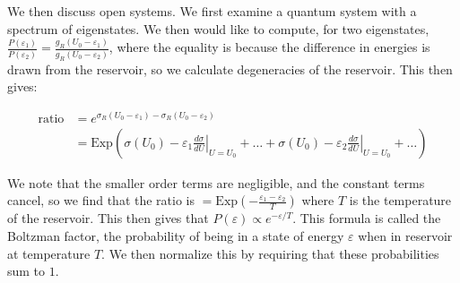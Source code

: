 \documentclass[12pt]{article}
\begin{document}
We then discuss open systems. We first examine a quantum system with a spectrum of eigenstates. We then would like to compute, for two eigenstates, $\frac{P(\varepsilon_1)}{P(\varepsilon_2)} = \frac{g_R(U_0 - \varepsilon_1)}{g_R(U_0 - \varepsilon_2)}$, where the equality is because the difference in energies is drawn from the reservoir, so we calculate degeneracies of the reservoir. This then gives:

\begin{align*}
	\text{ratio} &= e^{\sigma_R(U_0-\varepsilon_1) - \sigma_R(U_0-\varepsilon_2)}\\
	&= \mathrm{Exp}(\sigma(U_0) - \varepsilon_1\left. \frac{d\sigma}{dU}\right|_{U = U_0} +\dots + \sigma(U_0) - \varepsilon_2\left.\frac{d\sigma}{dU}\right|_{U=U_0} +\dots)
\end{align*}

	We note that the smaller order terms are negligible, and the constant terms cancel, so we find that the ratio is $= \mathrm{Exp}(-\frac{\varepsilon_1 - \varepsilon_2}{T})$ where $T$ is the temperature of the reservoir. This then gives that $P(\varepsilon) \propto e^{-\varepsilon/T}$. This formula is called the Boltzman factor, the probability of being in a state of energy $\varepsilon$ when in reservoir at temperature $T$. We then normalize this by requiring that these probabilities sum to $1$. 
\end{document}

